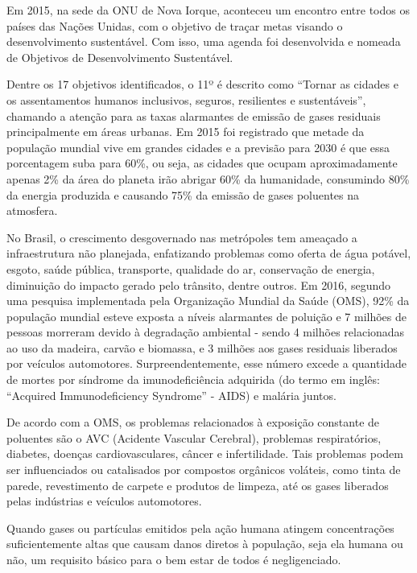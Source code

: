 
Em 2015, na sede da ONU de Nova Iorque, aconteceu um encontro entre todos os países das Nações 
Unidas, com o objetivo de traçar metas visando o desenvolvimento sustentável. Com isso, uma agenda 
foi desenvolvida e nomeada de Objetivos de Desenvolvimento Sustentável. 

Dentre os 17 objetivos identificados, o 11º é descrito como ``Tornar as cidades e os assentamentos 
humanos inclusivos, seguros, resilientes e sustentáveis'', chamando a atenção para as taxas 
alarmantes de emissão de gases residuais principalmente em áreas urbanas. Em 2015 foi registrado que 
metade da população mundial vive em grandes cidades e a previsão para 2030 é que essa porcentagem 
suba para 60\%, ou seja, as cidades que ocupam aproximadamente apenas 2\% da área do planeta irão 
abrigar 60\% da humanidade, consumindo 80\% da energia produzida e causando 75\% da emissão de gases 
poluentes na atmosfera. 

No Brasil, o crescimento desgovernado nas metrópoles tem ameaçado a infraestrutura não planejada, 
enfatizando problemas como oferta de água potável, esgoto, saúde pública, transporte, qualidade do 
ar, conservação de energia, diminuição do impacto gerado pelo trânsito, dentre outros. Em 2016, 
segundo uma pesquisa implementada pela Organização Mundial da Saúde (OMS), 92\% da população mundial 
esteve exposta a níveis alarmantes de poluição e 7  milhões de pessoas morreram devido à degradação 
ambiental - sendo 4 milhões relacionadas ao uso da madeira, carvão e biomassa, e 3 milhões aos gases 
residuais liberados por veículos automotores. Surpreendentemente, esse número excede a quantidade de 
mortes por síndrome da imunodeficiência adquirida (do termo em inglês: ``Acquired Immunodeficiency 
Syndrome'' - AIDS) e malária juntos.

De acordo com a OMS, os problemas relacionados à exposição constante de poluentes são o AVC 
(Acidente Vascular Cerebral), problemas respiratórios, diabetes, doenças cardiovasculares, câncer e 
infertilidade. Tais problemas podem ser influenciados ou catalisados por compostos orgânicos 
voláteis, como tinta de parede, revestimento de carpete e produtos de limpeza, até os gases 
liberados pelas indústrias e veículos automotores.

Quando gases ou partículas emitidos pela ação humana atingem concentrações suficientemente altas que 
causam danos diretos à população, seja ela humana ou não, um requisito básico para o bem estar de 
todos é negligenciado.

